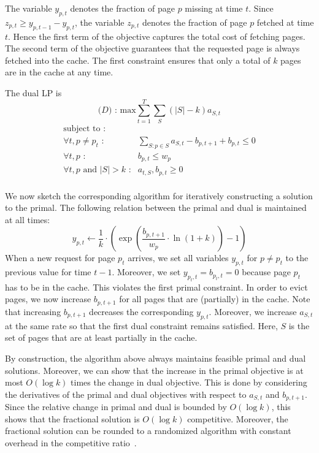 The variable $y_{p,t}$ denotes the fraction of page $p$ missing at time $t$.
Since $z_{p,t} \geq y_{p,t-1} - y_{p,t}$, the variable $z_{p,t}$ denotes the fraction of page $p$ fetched at time $t$.
Hence the first term of the objective captures the total cost of fetching pages.
The second term of the objective guarantees that the requested page is always fetched into the cache.
The first constraint ensures that only a total of $k$ pages are in the cache at any time.

The dual LP is
\[
\textrm{($D$) : max}  \sum_{t=1}^T\sum_S (|S| - k) a_{S,t}
\]
\[
	\begin{array}{rr}
	\textrm{subject to :} & \\
	\forall t,p \neq p_t \textrm{ :} & \sum_{S: p \in S} a_{S,t} - b_{p, t+1} + b_{p,t} \leq 0 \\
	\forall t,p \textrm{ :} & b_{p,t} \leq w_p \\
	\forall t,p \textrm{ and } |S| > k \textrm{ :} & a_{t,S}, b_{p,t} \geq 0 \\
	\end{array}
\]

We now sketch the corresponding algorithm for iteratively constructing a solution to the primal.
The following relation between the primal and dual is maintained at all times:
\[
y_{p,t} \leftarrow \frac{1}{k} \cdot \left( \exp \left( \frac{b_{p,t+1}}{w_p} \cdot \ln(1+k) \right) - 1 \right)
\]
When a new request for page $p_t$ arrives, we set all variables $y_{p,t}$ for $p \neq p_t$ to the previous value for time $t-1$.
Moreover, we set $y_{p_t, t} = b_{p_t, t} = 0$ because page $p_t$ has to be in the cache.
This violates the first primal constraint.
In order to evict pages, we now increase $b_{p, t+1}$ for all pages that are (partially) in the cache.
Note that increasing $b_{p, t+1}$ decreases the corresponding $y_{p,t}$.
Moreover, we increase $a_{S,t}$ at the same rate so that the first dual constraint remains satisfied.
Here, $S$ is the set of pages that are at least partially in the cache.

By construction, the algorithm above always maintains feasible primal and dual solutions.
Moreover, we can show that the increase in the primal objective is at most $O(\log k)$ times the change in dual objective.
This is done by considering the derivatives of the primal and dual objectives with respect to $a_{S,t}$ and $b_{p,t+1}$.
Since the relative change in primal and dual is bounded by $O(\log k)$, this shows that the fractional solution is $O(\log k)$ competitive.
Moreover, the fractional solution can be rounded to a randomized algorithm with constant overhead in the competitive ratio~\cite{bansal07:weighted-paging}.


